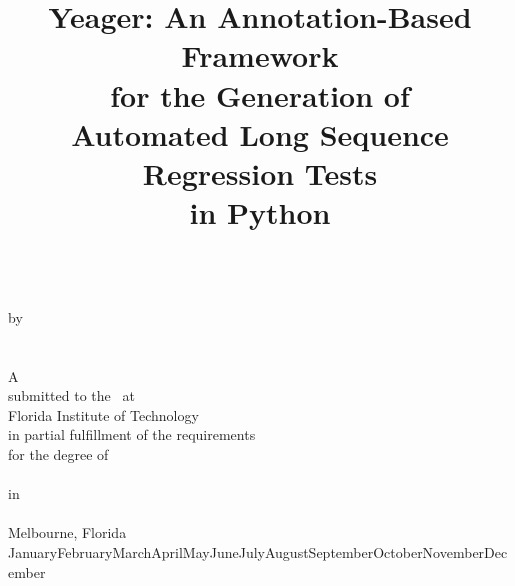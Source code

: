 \documentclass[12pt]{report}
\title{Yeager: An Annotation-Based Framework \\for the Generation of \\Automated Long Sequence Regression Tests \\in Python} %
\begin{document}
\edef\today{%
\ifcase\month\or January\or February\or March\or April\or May\or June\or July\or August\or September\or October\or November\or December\fi{}
\number\year}
\thispagestyle{empty}
\vspace*{0.5in}
\begin{center}
\textbf{
{\Large
\lastitle\\
}}
\vspace{2\baselineskip}
by\\[1\baselineskip]
\lasstudent\\[1\baselineskip]
\lasstudentpredegreefirst\\[1\baselineskip]
A \lasthesisstyle\\
submitted to the \lascollegename\ at\\
Florida Institute of Technology\\
in partial fulfillment of the requirements\\
for the degree of\\[3\baselineskip]
\lasdegree\\
in\\
\lasdiscipline\\
\vspace{\fill}
Melbourne, Florida\\
\today
\end{center}
\permissionpage{}
\committeepage{}
\newpage

\tableofcontents
\newpage


\doublespacing {}






\end{document}
